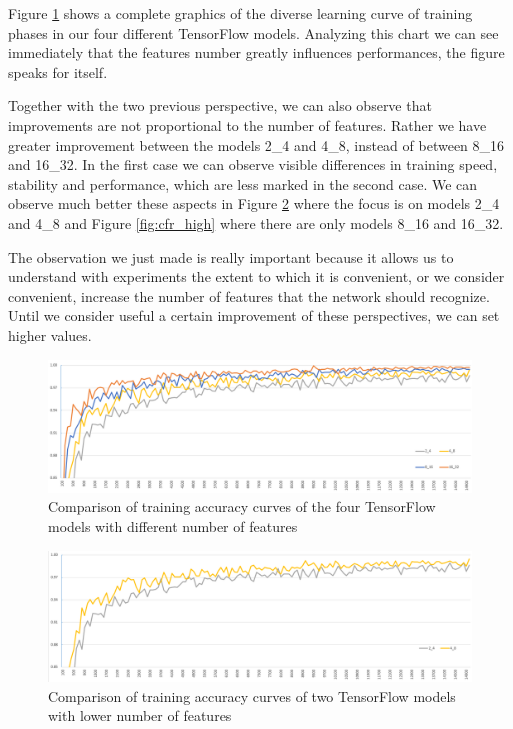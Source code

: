 Figure \ref{fig:cfr_all} shows a complete graphics of the diverse learning curve of training phases in our four different TensorFlow models. Analyzing this chart we can see immediately that the features number greatly influences performances, the figure speaks for itself.

Together with the two previous perspective, we can also observe that improvements are not proportional to the number of features. Rather we have greater improvement between the models 2\_4 and 4\_8, instead of between 8\_16 and 16\_32. In the first case we can observe visible differences in training speed, stability and performance, which are less marked in the second case. We can observe much better these aspects in Figure \ref{fig:cfr_low} where the focus is on models 2\_4 and 4\_8 and Figure \ref{fig:cfr_high} where there are only models 8\_16 and 16\_32.

The observation we just made is really important because it allows us to understand with experiments the extent to which it is convenient, or we consider convenient, increase the number of features that the network should recognize. Until we consider useful a certain improvement of these perspectives, we can set higher values. 

\begin{landscape}
	\begin{figure}
		\centering
		\caption{Comparison of training accuracy curves of the four TensorFlow models with different number of features}
		\label{fig:cfr_all}
		\includegraphics[width=1\textheight]{Images/cfr_all}
	\end{figure}
\end{landscape}

\begin{landscape}
\begin{figure}
	\centering
	\caption{Comparison of training accuracy curves of two TensorFlow models with lower number of features}
	\label{fig:cfr_low}
	\includegraphics[width=1\textheight]{Images/cfr_2_4_vs_4_8}
\end{figure}
\end{landscape}


